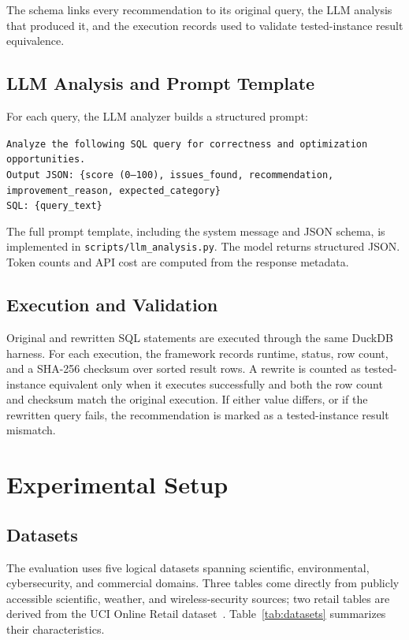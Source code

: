 \documentclass[conference]{IEEEtran}
\begin{document}
The schema links every recommendation to its original query, the LLM analysis that produced it, and the execution records used to validate tested-instance result equivalence.

\subsection{LLM Analysis and Prompt Template}
For each query, the LLM analyzer builds a structured prompt:

\medskip
\noindent\texttt{Analyze the following SQL query for correctness and optimization opportunities.}\\
\texttt{Output JSON: \{score (0--100), issues\_found, recommendation, improvement\_reason, expected\_category\}}\\
\texttt{SQL: \{query\_text\}}
\medskip

The full prompt template, including the system message and JSON schema, is implemented in \texttt{scripts/llm\_analysis.py}. The model returns structured JSON. Token counts and API cost are computed from the response metadata.

\subsection{Execution and Validation}
Original and rewritten SQL statements are executed through the same DuckDB harness. For each execution, the framework records runtime, status, row count, and a SHA-256 checksum over sorted result rows. A rewrite is counted as tested-instance equivalent only when it executes successfully and both the row count and checksum match the original execution. If either value differs, or if the rewritten query fails, the recommendation is marked as a tested-instance result mismatch.

\section{Experimental Setup}
\subsection{Datasets}
The evaluation uses five logical datasets spanning scientific, environmental, cybersecurity, and commercial domains. Three tables come directly from publicly accessible scientific, weather, and wireless-security sources; two retail tables are derived from the UCI Online Retail dataset~\cite{chen2015online}. Table~\ref{tab:datasets} summarizes their characteristics.
\end{document}
